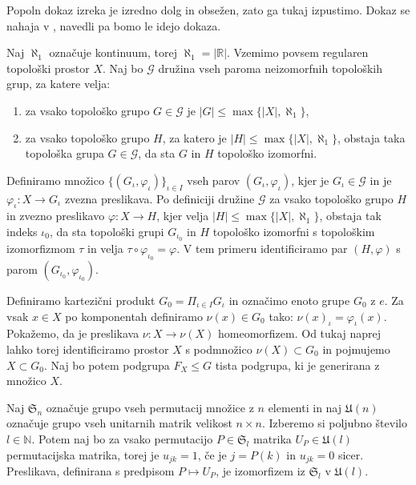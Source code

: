 \documentclass[mat1]{fmfdelo}
\newcommand{\R}{\mathbb R}
\newcommand{\N}{\mathbb N}
\begin{document}
\begin{dokaz}
Popoln dokaz izreka je izredno dolg in obsežen, zato ga tukaj izpustimo. Dokaz se nahaja v \cite[(8.8)]{bib:aha1}, navedli pa bomo le idejo dokaza.

Naj $\aleph_1$ označuje kontinuum, torej $\aleph_1 = |\R|$. Vzemimo povsem regularen topološki prostor $X$. Naj bo $\mathcal{G}$ družina vseh paroma neizomorfnih topoloških grup, za katere velja:
\begin{enumerate}[label=(\roman*)]
\item za vsako topološko grupo $G \in \mathcal{G}$ je $|G| \leq \max\lbrace |X|, \aleph_1\rbrace$,
\item za vsako topološko grupo $H$, za katero je $|H| \leq \max\lbrace |X|, \aleph_1\rbrace$, obstaja taka topološka grupa $G \in \mathcal{G}$, da sta $G$ in $H$ topološko izomorfni.
\end{enumerate}
Definiramo množico $\lbrace (G_\iota, \varphi_\iota)\rbrace_{\iota \in I}$ vseh parov $(G_\iota, \varphi_\iota)$, kjer je $G_\iota \in \mathcal{G}$ in je $\varphi_\iota\colon X \to G_\iota$ zvezna preslikava. Po definiciji družine $\mathcal{G}$ za vsako topološko grupo $H$ in zvezno preslikavo $\varphi\colon X \to H$, kjer velja $|H| \leq \max\lbrace |X|, \aleph_1\rbrace$, obstaja tak indeks $\iota_0$, da sta topološki grupi $G_{\iota_0}$ in $H$ topološko izomorfni s topološkim izomorfizmom $\tau$ in velja $\tau\circ\varphi_{\iota_0} = \varphi$.
V tem primeru identificiramo par $(H, \varphi)$ s parom $(G_{\iota_0}, \varphi_{\iota_0})$.

Definiramo kartezični produkt $G_0 = \Pi_{\iota \in I}G_\iota$ in označimo enoto grupe $G_0$ z $e$. Za vsak $x \in X$ po komponentah definiramo $\nu(x) \in G_0$ tako: $\nu(x)_\iota = \varphi_\iota(x)$. Pokažemo, da je preslikava $\nu\colon X \to \nu(X)$ homeomorfizem.
Od tukaj naprej lahko torej identificiramo prostor $X$ s podmnožico $\nu(X) \subset G_0$ in pojmujemo $X \subset G_0$.
Naj bo potem podgrupa $F_X \leq G$ tista podgrupa, ki je generirana z množico $X$.

Naj $\mathfrak{S}_n$ označuje grupo vseh permutacij množice z $n$ elementi in naj $\mathfrak{U}(n)$ označuje grupo vseh unitarnih matrik velikost $n\times n$. Izberemo si poljubno število $l \in \N$. Potem naj bo za vsako permutacijo $P \in \mathfrak{S}_l$ matrika $U_P \in \mathfrak{U}(l)$ permutacijska matrika, torej je $u_{jk} = 1$, če je $j = P(k)$ in $u_{jk} = 0$ sicer. Preslikava, definirana s predpisom $P \mapsto U_P$, je izomorfizem iz $\mathfrak{S}_l$ v $\mathfrak{U}(l)$.


\end{dokaz}
\end{document}
